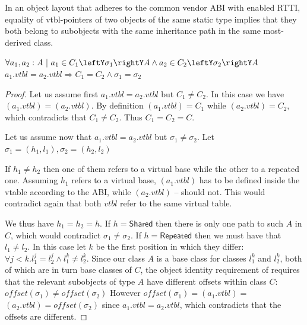 \begin{theorem}
In an object layout that adheres to the common vendor \Cpp{} ABI with enabled RTTI, 
equality of vtbl-pointers of two objects of the same static type implies that 
they both belong to subobjects with the same inheritance path in the same most-derived class.

\noindent
$\forall a_1, a_2 : A\ |\ a_1\in C_1\leftY\sigma_1\rightY A \wedge a_2\in C_2\leftY\sigma_2\rightY A $ \\ 
$a_1.\textit{vtbl} = a_2.\textit{vtbl} \Rightarrow C_1 = C_2 \wedge \sigma_1 = \sigma_2$
\label{thm:vtbl}
\end{theorem}
\begin{proof}
Let us assume first $a_1.\textit{vtbl} = a_2.\textit{vtbl}$ but $C_1 \neq C_2$. In this case we 
have $(a_1.\textit{vtbl}) = $$(a_2.\textit{vtbl})$. By definition 
$(a_1.\textit{vtbl}) = C_1$ while $(a_2.\textit{vtbl}) = C_2$, which 
contradicts that $C_1 \neq C_2$. Thus $C_1 = C_2 = C$.

Let us assume now that $a_1.\textit{vtbl} = a_2.\textit{vtbl}$ but $\sigma_1 \neq \sigma_2$. 
Let $\sigma_1=(h_1,l_1),\sigma_2=(h_2,l_2)$ 

If $h_1 \neq h_2$ then one of them refers to a virtual base while the other to a 
repeated one. Assuming $h_1$ refers to a virtual base, $(a_1.\textit{vtbl})$ 
has to be defined inside the vtable according to the ABI, while 
$(a_2.\textit{vtbl})$ -- should not. This would contradict again that both 
$vtbl$ refer to the same virtual table.

We thus have $h_1 = h_2 = h$. If $h = \mathsf{Shared}$ then there is only one path to 
such $A$ in $C$, which would contradict $\sigma_1 \neq \sigma_2$. 
If $h = \mathsf{Repeated}$ then we must have that $l_1 \neq l_2$. In this case let $k$ be 
the first position in which they differ: 
$\forall j<k.l_1^j=l_2^j \wedge l_1^k\neq l_2^k$. Since our class $A$ is a base 
class for classes $l_1^k$ and $l_2^k$, both of which are in turn base classes of 
$C$, the object identity requirement of \Cpp{} requires that the relevant subobjects 
of type $A$ have different offsets within class $C$: 
$\mathit{offset}(\sigma_1)\neq \mathit{offset}(\sigma_2)$ However 
$\mathit{offset}(\sigma_1)=$$(a_1.\textit{vtbl})=$$(a_2.\textit{vtbl})=\mathit{offset}(\sigma_2)$ 
since $a_1.\textit{vtbl} = a_2.\textit{vtbl}$, which contradicts that the offsets are different.
\end{proof}

